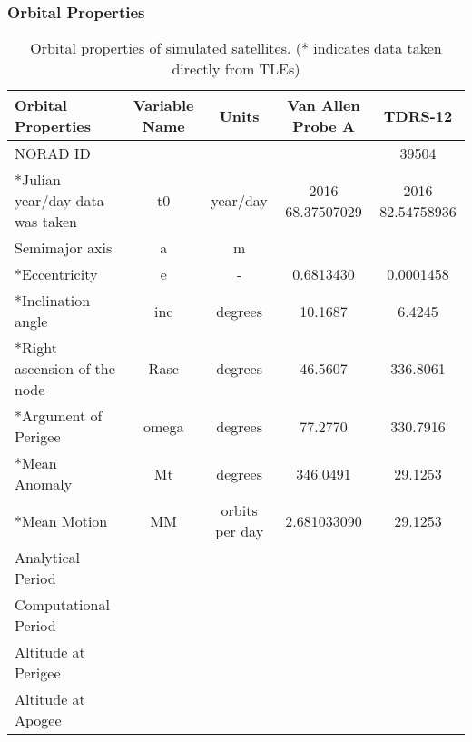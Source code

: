 \documentclass[Space3_Assign1.tex]{subfiles}
\begin{document}
\subsubsection{Orbital Properties}
\begin{table}[h]
\centering
\caption{Orbital properties of simulated satellites. (* indicates data taken directly from TLEs)}
\label{Q1.orbitprop}
\begin{tabular}{|l|c|c|c|c|}
	\hline
	Orbital Properties              & Variable Name &     Units      & Van Allen Probe A &     TDRS-12      \\ \hline
	NORAD ID                        &               &                &                   &      39504       \\ \hline
	*Julian year/day data was taken &      t0       &    year/day    & 2016 68.37507029  & 2016 82.54758936 \\ \hline
	Semimajor axis                  &       a       &       m        &                   &  \\ \hline
	*Eccentricity                   &       e       &       -        &     0.6813430     &    0.0001458     \\ \hline
	*Inclination angle              &      inc      &    degrees     &      10.1687      &      6.4245      \\ \hline
	*Right ascension of the node    &     Rasc      &    degrees     &      46.5607      &     336.8061     \\ \hline
	*Argument of Perigee            &     omega     &    degrees     &      77.2770      &     330.7916     \\ \hline
	*Mean Anomaly                   &      Mt       &    degrees     &     346.0491      &     29.1253      \\\hline
	*Mean Motion             &      MM       & orbits per day &    2.681033090    &     29.1253      \\ \hline
	Analytical Period               &               &                &                   &  \\ \hline
	Computational Period            &               &                &                   &  \\ \hline
	Altitude at Perigee             &               &                &                   &  \\ \hline
	Altitude at Apogee              &               &                &                   &  \\ \hline
\end{tabular}
\end{table}

\end{document}
